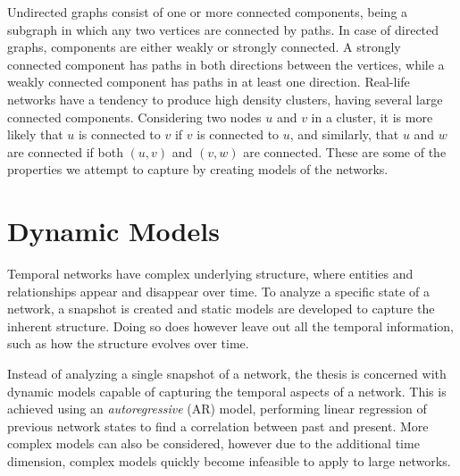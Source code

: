     Undirected graphs consist of one or more connected components, being a subgraph in which any two vertices are connected by paths. 
    In case of directed graphs, components are either weakly or strongly connected. A strongly connected component has paths in both directions between the vertices, while a weakly connected component has paths in at least one direction. 
    Real-life networks have a tendency to produce high density clusters, having several large connected components. 
    Considering two nodes $u$ and $v$ in a cluster, it is more likely that $u$ is connected to $v$ if $v$ is connected to $u$, and similarly, that $u$ and $w$ are connected if both $(u,v)$ and $(v,w)$ are connected. These are some of the properties we attempt to capture by creating models of the networks.

\section{Dynamic Models}

    Temporal networks have complex underlying structure, where entities and relationships appear and disappear over time. To analyze a specific state of a network, a snapshot is created and static models are developed to capture the inherent structure.
    Doing so does however leave out all the temporal information, such as how the structure evolves over time.
    
    Instead of analyzing a single snapshot of a network, the thesis is concerned with dynamic models capable of capturing the temporal aspects of a network. This is achieved using an \emph{autoregressive} (AR) model, performing linear regression of previous network states to find a correlation between past and present. More complex models can also be considered, however due to the additional time dimension, complex models quickly become infeasible to apply to large networks.
    
